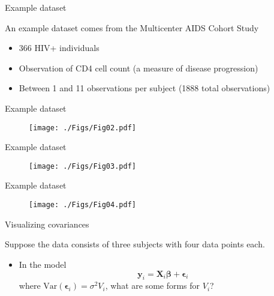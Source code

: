 \documentclass{beamer}
\newcommand{\myitem}{\item[\tiny$\blacksquare$]}
\def\by{\boldsymbol{y}}
\def\bX{\boldsymbol{X}}
\def\bbeta{\boldsymbol{\beta}}
\def\bepsilon{\boldsymbol{\epsilon}}
\newcommand{\bi}{\begin{itemize}}
\newcommand{\ei}{\end{itemize}}
\newcommand{\var}{\mbox{Var}}
\newcommand{\1}{{\mathbf{1}}}
\begin{document}

\begin{frame}{Example dataset}

An example dataset comes from the Multicenter AIDS Cohort Study
\bi
	\myitem 366 HIV+ individuals
	\myitem Observation of CD4 cell count (a measure of disease progression)
	\myitem Between 1 and 11 observations per subject (1888 total observations)
\ei

\end{frame}



\begin{frame}{Example dataset}

\begin{figure}[h]
    \texttt{[image: ./Figs/Fig02.pdf]}  
\end{figure}

\end{frame}



\begin{frame}{Example dataset}

\begin{figure}[h]
    \texttt{[image: ./Figs/Fig03.pdf]}  
\end{figure}

\end{frame}



\begin{frame}{Example dataset}

\begin{figure}[h]
    \texttt{[image: ./Figs/Fig04.pdf]}  
\end{figure}

\end{frame}



\begin{frame}[t]{Visualizing covariances}

Suppose the data consists of three subjects with four data points each. 
\bi
	\myitem In the model
		$$ \by_{i} = \bX_{i} \bbeta + \bepsilon_{i}$$
	where $\var(\bepsilon_{i}) = \sigma^2 V_{i}$, what are some forms for $V_{i}$?
\ei

\end{frame}
\end{document}
